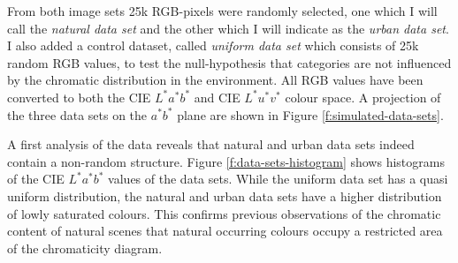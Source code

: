 From both image sets 25k RGB-pixels were randomly selected, one which
I will call the \emph{natural data set} and the other which I will
indicate as the \emph{urban data set}. I also added a control dataset,
called \emph{uniform data set} which consists of 25k random RGB
values, to test the null-hypothesis that categories are not influenced
by the chromatic distribution in the environment. All RGB values have
been converted to both the CIE $L^*a^*b^*$ and CIE $L^*u^*v^*$ colour
space. A projection of the three data sets on the $a^*b^*$ plane are
shown in Figure \ref{f:simulated-data-sets}.

A first analysis of the data reveals that natural and urban data sets
indeed contain a non-random structure. Figure
\ref{f:data-sets-histogram} shows histograms of the CIE $L^*a^*b^*$
values of the data sets. While the uniform data set has a quasi
uniform distribution, the natural and urban data sets have a higher
distribution of lowly saturated colours. This confirms previous
observations of the chromatic content of natural scenes
\citep{howard94colors} that natural occurring
colours occupy a restricted area of the chromaticity diagram.

